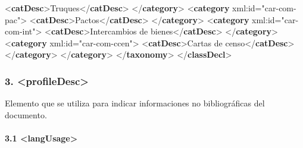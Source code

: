 \documentclass[
]{book}
\newenvironment{Shaded}{\begin{snugshade}}{\end{snugshade}}
\newcommand{\KeywordTok}[1]{\textcolor[rgb]{0.13,0.29,0.53}{\textbf{#1}}}
\newcommand{\NormalTok}[1]{#1}
\newcommand{\OtherTok}[1]{\textcolor[rgb]{0.56,0.35,0.01}{#1}}
\newcommand{\StringTok}[1]{\textcolor[rgb]{0.31,0.60,0.02}{#1}}
\begin{document}
\begin{Shaded}
\begin{Highlighting}[]
\NormalTok{             \textless{}}\KeywordTok{catDesc}\NormalTok{\textgreater{}Truques\textless{}/}\KeywordTok{catDesc}\NormalTok{\textgreater{}}
\NormalTok{          \textless{}/}\KeywordTok{category}\NormalTok{\textgreater{}}
\NormalTok{          \textless{}}\KeywordTok{category}\OtherTok{ xml:id=}\StringTok{"car{-}com{-}pac"}\NormalTok{\textgreater{}}
\NormalTok{             \textless{}}\KeywordTok{catDesc}\NormalTok{\textgreater{}Pactos\textless{}/}\KeywordTok{catDesc}\NormalTok{\textgreater{}}
\NormalTok{          \textless{}/}\KeywordTok{category}\NormalTok{\textgreater{}}
\NormalTok{          \textless{}}\KeywordTok{category}\OtherTok{ xml:id=}\StringTok{"car{-}com{-}int"}\NormalTok{\textgreater{}}
\NormalTok{             \textless{}}\KeywordTok{catDesc}\NormalTok{\textgreater{}Intercambios de bienes\textless{}/}\KeywordTok{catDesc}\NormalTok{\textgreater{}}
\NormalTok{          \textless{}/}\KeywordTok{category}\NormalTok{\textgreater{}}
\NormalTok{          \textless{}}\KeywordTok{category}\OtherTok{ xml:id=}\StringTok{"car{-}com{-}ccen"}\NormalTok{\textgreater{}}
\NormalTok{             \textless{}}\KeywordTok{catDesc}\NormalTok{\textgreater{}Cartas de censo\textless{}/}\KeywordTok{catDesc}\NormalTok{\textgreater{}}
\NormalTok{          \textless{}/}\KeywordTok{category}\NormalTok{\textgreater{}}
\NormalTok{       \textless{}/}\KeywordTok{category}\NormalTok{\textgreater{}}
\NormalTok{    \textless{}/}\KeywordTok{taxonomy}\NormalTok{\textgreater{}}
\NormalTok{ \textless{}/}\KeywordTok{classDecl}\NormalTok{\textgreater{}}
\end{Highlighting}
\end{Shaded}

\hypertarget{profiledesc}{%
\subsubsection*{\texorpdfstring{3. { \textless profileDesc\textgreater{} }}{3.  \textless profileDesc\textgreater{} }}\label{profiledesc}}

Elemento que se utiliza para indicar informaciones no bibliográficas del documento.

\hypertarget{langusage}{%
\paragraph*{\texorpdfstring{3.1 { \textless langUsage\textgreater{} }}{3.1  \textless langUsage\textgreater{} }}\label{langusage}}
\end{document}
